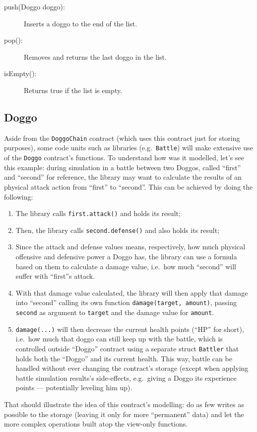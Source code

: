 \documentclass{article}
\begin{document}
    \begin{description}
        \item[push(Doggo doggo):] Inserts a doggo to the end of the list.
        \item[pop():] Removes and returns the last doggo in the list.
        \item[isEmpty():] Returns true if the list is empty.
    \end{description}

    \subsection{Doggo}

    Aside from the \texttt{DoggoChain} contract (which uses this contract just
    for storing purposes), some code units such as libraries (e.g.\
    \texttt{Battle}) will make extensive use of the \texttt{Doggo} contract's
    functions. To understand how was it modelled, let's see this example:
    during simulation in a battle between two Doggos, called ``first'' and
    ``second'' for reference, the library may want to calculate the results of
    an physical attack action from ``first'' to ``second''. This can be
    achieved by doing the following:

    \begin{enumerate}
        \item The library calls \texttt{first.attack()} and holds its result;
        \item Then, the library calls \texttt{second.defense()} and also holds
            its result;
        \item Since the attack and defense values means, respectively, how much
            physical offensive and defensive power a Doggo has, the library can
            use a formula based on them to calculate a damage value, i.e.\ how
            much ``second'' will suffer with ``first''s attack.
        \item With that damage value calculated, the library will then apply
            that damage into ``second'' calling its own function
            \texttt{damage(target, amount)}, passing \texttt{second} as
            argument to \texttt{target} and the damage value for
            \texttt{amount}.
        \item \texttt{damage(...)} will then decrease the current health points
            (``HP'' for short), i.e.\ how much that doggo can still keep up
            with the battle, which is controlled outside ``Doggo'' contract
            using a separate struct \texttt{Battler} that holds both the
            ``Doggo'' and its current health. This way, battle can be handled
            without ever changing the contract's storage (except when applying
            battle simulation results's side-effects, e.g.\ giving a Doggo its
            experience points --- potentially leveling him up).
    \end{enumerate}

    That should illustrate the idea of this contract's modelling: do as few
    writes as possible to the storage (leaving it only for more ``permanent''
    data) and let the more complex operations built atop the view-only
    functions.
\end{document}
